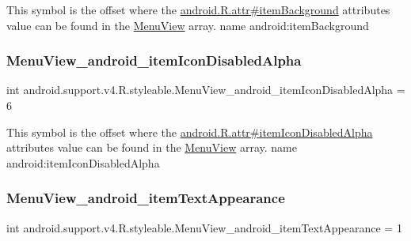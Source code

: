 This symbol is the offset where the \hyperlink{}{android.\+R.\+attr\#item\+Background} attribute\textquotesingle{}s value can be found in the \hyperlink{classandroid_1_1support_1_1v4_1_1R_1_1styleable_a6f981f3b295d914b69b142c57cdfcabf}{Menu\+View} array.  name android\+:item\+Background \mbox{\label{classandroid_1_1support_1_1v4_1_1R_1_1styleable_aa9bab0281cd32b9892b27ae9cf5ee6e6}} 
\subsubsection{\texorpdfstring{Menu\+View\+\_\+android\+\_\+item\+Icon\+Disabled\+Alpha}{MenuView\_android\_itemIconDisabledAlpha}}
{\footnotesize\ttfamily int android.\+support.\+v4.\+R.\+styleable.\+Menu\+View\+\_\+android\+\_\+item\+Icon\+Disabled\+Alpha = 6\hspace{0.3cm}{\ttfamily [static]}}

This symbol is the offset where the \hyperlink{}{android.\+R.\+attr\#item\+Icon\+Disabled\+Alpha} attribute\textquotesingle{}s value can be found in the \hyperlink{classandroid_1_1support_1_1v4_1_1R_1_1styleable_a6f981f3b295d914b69b142c57cdfcabf}{Menu\+View} array.  name android\+:item\+Icon\+Disabled\+Alpha \mbox{\label{classandroid_1_1support_1_1v4_1_1R_1_1styleable_a421fdc72dee45bf4d8a3528c310da6f7}} 
\subsubsection{\texorpdfstring{Menu\+View\+\_\+android\+\_\+item\+Text\+Appearance}{MenuView\_android\_itemTextAppearance}}
{\footnotesize\ttfamily int android.\+support.\+v4.\+R.\+styleable.\+Menu\+View\+\_\+android\+\_\+item\+Text\+Appearance = 1\hspace{0.3cm}{\ttfamily [static]}}

